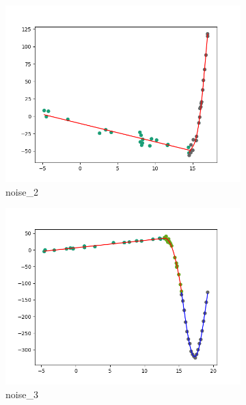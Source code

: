 \documentclass[notitlepage, 11pt]{report}
\begin{document}
\begin{figure}[H]
				\medskip
				\begin{subfigure}{0.25\textwidth}
					\includegraphics[width=\linewidth]{Figure_7}
					\caption{noise\_2}
					\label{fig:7}
				\end{subfigure}\hfil %
				\begin{subfigure}{0.25\textwidth}
					\includegraphics[width=\linewidth]{Figure_8}
					\caption{noise\_3}
					\label{fig:8}
				\end{subfigure}\hfil %
				\begin{subfigure}{0.25\textwidth}

\end{subfigure}
\end{figure}
\end{document}
